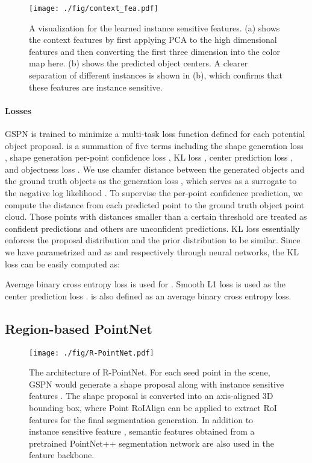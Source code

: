 \documentclass[10pt,twocolumn,letterpaper]{article}
\begin{document}
\begin{figure}
    \centering
    \texttt{[image: ./fig/context\_fea.pdf]}
    \caption{A visualization for the learned instance sensitive features. (a) shows the context features  by first applying PCA to the high dimensional features and then converting the first three dimension into the color map here. (b) shows the predicted object centers. A clearer separation of different instances is shown in (b), which confirms that these features are instance sensitive.}
    \label{fig:context_fea}
    \vspace{-\baselineskip}
\end{figure}

\vspace{-\baselineskip}
\paragraph{Losses} GSPN is trained to minimize a multi-task loss function  defined for each potential object proposal.  is a summation of five terms including the shape generation loss , shape generation per-point confidence loss , KL loss , center prediction loss , and objectness loss . We use chamfer distance between the generated objects  and the ground truth objects  as the generation loss , which serves as a surrogate to the negative log likelihood . To supervise the per-point confidence prediction, we compute the distance from each predicted point to the ground truth object point cloud. Those points with distances smaller than a certain threshold  are treated as confident predictions and others are unconfident predictions. KL loss essentially enforces the proposal distribution  and the prior distribution  to be similar. Since we have parametrized  and  as  and  respectively through neural networks, the KL loss can be easily computed as:
\vspace{-0.5\baselineskip}

\noindent
Average binary cross entropy loss is used for . Smooth L1 loss \cite{girshick2015fast} is used as the center prediction loss .  is also defined as an average binary cross entropy loss.

\subsection{Region-based PointNet}
\begin{figure*}[t!]
    \centering
    \texttt{[image: ./fig/R-PointNet.pdf]}
    \caption{The architecture of R-PointNet. For each seed point in the scene, GSPN would generate a shape proposal along with instance sensitive features . The shape proposal is converted into an axis-aligned 3D bounding box, where Point RoIAlign can be applied to extract RoI features for the final segmentation generation. In addition to instance sensitive feature , semantic features obtained from a pretrained PointNet++ segmentation network are also used in the feature backbone.}
    \label{fig:rpointnet}
    \vspace{-\baselineskip}
\end{figure*}
\end{document}
